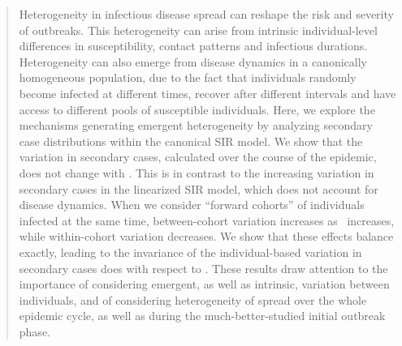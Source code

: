 \begin{abstract}
Heterogeneity in infectious disease spread can reshape the risk and severity of outbreaks. This heterogeneity can arise from intrinsic individual-level differences in susceptibility, contact patterns and infectious durations. Heterogeneity can also emerge from disease dynamics in a canonically homogeneous population, due to the fact that individuals randomly become infected at different times, recover after different intervals and have access to different pools of susceptible individuals. Here, we explore the mechanisms generating emergent heterogeneity by analyzing secondary case distributions within the canonical SIR model. We show that the variation in secondary cases, calculated over the course of the epidemic, does not change with \Ro. This is in contrast to the increasing variation in secondary cases in the linearized SIR model, which does not account for disease dynamics. When we consider “forward cohorts” of individuals infected at the same time, between-cohort variation increases as \Ro\ increases, while within-cohort variation decreases. We show that these effects balance exactly, leading to the invariance of the individual-based variation in secondary cases does with respect to \Ro.  These results draw attention to the importance of considering emergent, as well as intrinsic, variation between individuals, and of considering heterogeneity of spread over the whole epidemic cycle, as well as during the much-better-studied initial outbreak phase.
\end{abstract}

